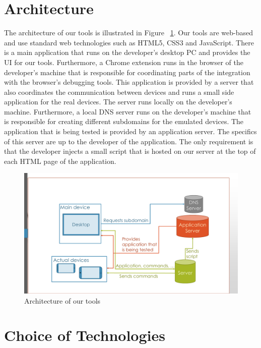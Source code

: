 \section{Architecture}

The architecture of our tools is illustrated in Figure ~\ref{fig:architecture}. Our tools are web-based and use standard web technologies such as HTML5, CSS3 and JavaScript. There is a main application that runs on the developer's desktop PC and provides the UI for our tools. Furthermore, a Chrome extension runs in the browser of the developer's machine that is responsible for coordinating parts of the integration with the  browser's debugging tools. This application is provided by a server that also coordinates the communication between devices and runs a small side application for the real devices. The server runs locally on the developer's machine. Furthermore, a local DNS server runs on the developer's machine that is responsible for creating different subdomains for the emulated devices. The application that is being tested is provided by an application server. The specifics of this server are up to the developer of the application. The only requirement is that the developer injects a small script that is hosted on our server at the top of each HTML page of the application.

\begin{figure}[H]
  \centering
    \includegraphics[width=1.0\textwidth]{images/architecture.pdf}
	\caption{Architecture of our tools}
	\label{fig:architecture}
\end{figure}

\section{Choice of Technologies}

